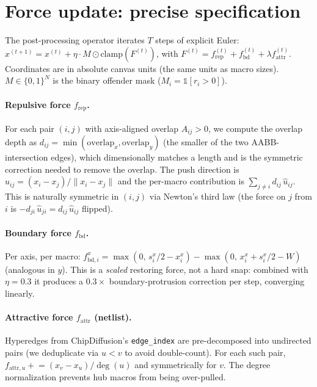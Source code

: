 \documentclass{article}
\begin{document}
\section{Force update: precise specification}
\label{sec:supp-force}

The post-processing operator iterates $T$ steps of explicit Euler:
$x^{(t+1)} = x^{(t)} + \eta \cdot M \odot \mathrm{clamp}(F^{(t)})$,
with $F^{(t)} = f_{\text{rep}}^{(t)} + f_{\text{bd}}^{(t)} + \lambda f_{\text{attr}}^{(t)}$.
Coordinates are in absolute canvas units (the same units as macro sizes).
$M \in \{0,1\}^N$ is the binary offender mask ($M_i = \mathbb{1}[r_i > 0]$).

\paragraph{Repulsive force $f_{\text{rep}}$.}  For each pair $(i,j)$ with
axis-aligned overlap $A_{ij}>0$, we compute the overlap depth as
$d_{ij} = \min(\mathrm{overlap}_x, \mathrm{overlap}_y)$ (the smaller of the
two AABB-intersection edges), which dimensionally matches a length and is
the symmetric correction needed to remove the overlap.  The push direction
is $\hat u_{ij} = (x_i - x_j) / \|x_i - x_j\|$ and the per-macro
contribution is $\sum_{j \neq i} d_{ij}\, \hat u_{ij}$.  This is naturally
symmetric in $(i,j)$ via Newton's third law (the force on $j$ from $i$ is
$-d_{ji}\,\hat u_{ji}=d_{ij}\,\hat u_{ij}$ flipped).

\paragraph{Boundary force $f_{\text{bd}}$.}  Per axis, per macro:
$f_{\text{bd},i}^x = \max(0,\, s_i^x/2 - x_i^x) - \max(0,\, x_i^x + s_i^x/2 - W)$
(analogous in $y$).  This is a \emph{scaled} restoring force, not a hard
snap: combined with $\eta = 0.3$ it produces a $0.3 \times$
boundary-protrusion correction per step, converging linearly.

\paragraph{Attractive force $f_{\text{attr}}$ (netlist).}
Hyperedges from ChipDiffusion's \texttt{edge\_index} are pre-decomposed into
undirected pairs (we deduplicate via $u<v$ to avoid double-count).  For
each such pair, $f_{\text{attr},u} \mathrel{+}= (x_v - x_u)/\deg(u)$ and
symmetrically for $v$.  The degree normalization prevents hub macros from
being over-pulled.
\end{document}
